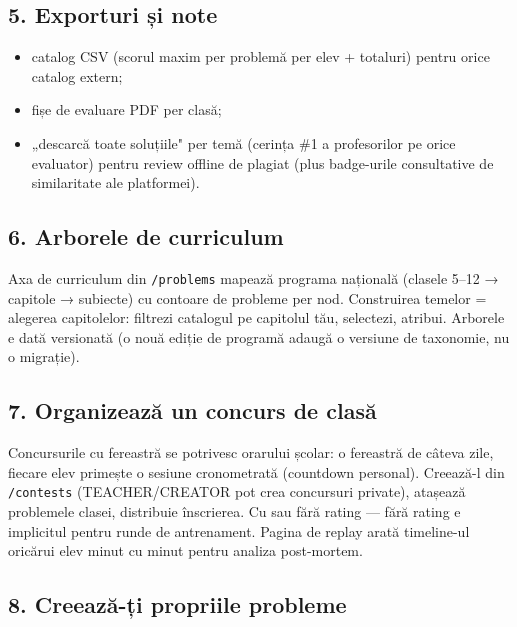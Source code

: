 \documentclass[
]{article}
\providecommand{\tightlist}{%
  \setlength{\itemsep}{0pt}\setlength{\parskip}{0pt}}
\begin{document}
\subsection{5. Exporturi și note}\label{5-exporturi-ux219i-note}

\begin{itemize}
\tightlist
\item
  catalog CSV (scorul maxim per problemă per elev + totaluri) pentru
  orice catalog extern;
\item
  fișe de evaluare PDF per clasă;
\item
  „descarcă toate soluțiile" per temă (cerința \#1 a profesorilor pe
  orice evaluator) pentru review offline de plagiat (plus badge-urile
  consultative de similaritate ale platformei).
\end{itemize}

\subsection{6. Arborele de curriculum}\label{6-arborele-de-curriculum}

Axa de curriculum din \texttt{/problems} mapează programa națională
(clasele 5--12 → capitole → subiecte) cu contoare de probleme per nod.
Construirea temelor = alegerea capitolelor: filtrezi catalogul pe
capitolul tău, selectezi, atribui. Arborele e dată versionată (o nouă
ediție de programă adaugă o versiune de taxonomie, nu o migrație).

\subsection{7. Organizează un concurs de
clasă}\label{7-organizeazux103-un-concurs-de-clasux103}

Concursurile cu fereastră se potrivesc orarului școlar: o fereastră de
câteva zile, fiecare elev primește o sesiune cronometrată (countdown
personal). Creează-l din \texttt{/contests} (TEACHER/CREATOR pot crea
concursuri private), atașează problemele clasei, distribuie înscrierea.
Cu sau fără rating --- fără rating e implicitul pentru runde de
antrenament. Pagina de replay arată timeline-ul oricărui elev minut cu
minut pentru analiza post-mortem.

\subsection{8. Creează-ți propriile
probleme}\label{8-creeazux103-ux21bi-propriile-probleme}
\end{document}
